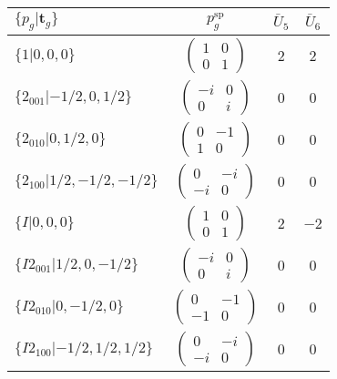 \documentclass[3p,preprint]{elsarticle}
\newcommand{\bt}{\bm{t}}
\begin{document}
\begin{table}[H]
	\begin{tabular}{|l|c||c|c|}\hline
			$\{p_g|\bt_g\}$ & $p_g^{\text{sp}}$ & $\bar{U}_5$ & $\bar{U}_6$  \\ \hline \hline
			$\{1|0,0,0\}$ & 					$\left(\begin{array}{cc} 1&0 \\ 0&1 \end{array}\right)$	& $2$ &  $2$ \\ \hline
			$\{2_{001}|-1/2,0,1/2\}$ &		$\left(\begin{array}{cc} -i&0 \\ 0&i \end{array}\right)$	& $0$ & $0$  \\ \hline
			$\{2_{010}|0,1/2,0\}$ &			$\left(\begin{array}{cc} 0&-1 \\ 1&0 \end{array}\right)$	& $0$ & $0$\\ \hline
			$\{2_{100}|1/2,-1/2,-1/2\}$ &		$\left(\begin{array}{cc} 0&-i \\ -i&0 \end{array}\right)$	& $0$ & $0$\\ \hline
			$\{I|0,0,0\}$ & 						$\left(\begin{array}{cc} 1&0 \\ 0&1 \end{array}\right)$	& $2$ &  $-2$\\ \hline
			$\{I2_{001}|1/2,0,-1/2\}$ &		$\left(\begin{array}{cc} -i&0 \\ 0&i \end{array}\right)$	& $0$ & $0$  \\ \hline
			$\{I2_{010}|0,-1/2,0\}$ &			$\left(\begin{array}{cc} 0&-1 \\ -1&0 \end{array}\right)$	& $0$ & $0$\\ \hline
			$\{I2_{100}|-1/2,1/2,1/2\}$ &		$\left(\begin{array}{cc} 0&-i \\ -i&0 \end{array}\right)$	& $0$ & $0$\\ \hline
	\end{tabular}
\end{table}
\end{document}

